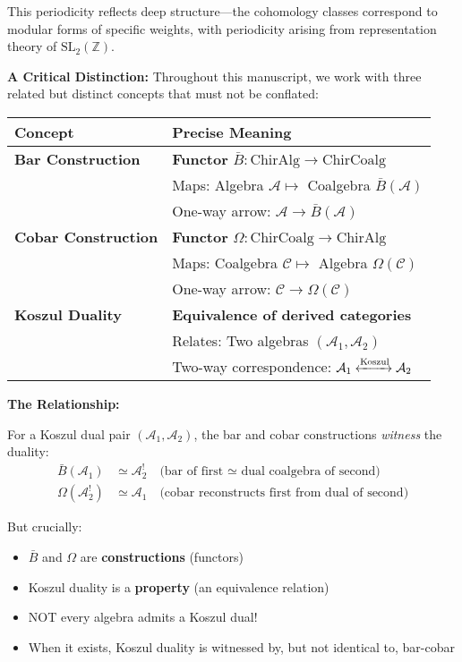 This periodicity reflects deep structure—the cohomology classes correspond to modular forms of specific weights, with periodicity arising from representation theory of $\text{SL}_2(\mathbb{Z})$.

\begin{remark}\label{rem:bar-cobar-koszul-distinction}
\textbf{A Critical Distinction:} Throughout this manuscript, we work with three related but distinct concepts that must not be conflated:

\begin{center}
\begin{tabular}{|l|p{10cm}|}
\hline
\textbf{Concept} & \textbf{Precise Meaning} \\
\hline
\textbf{Bar Construction} & \textbf{Functor} $\bar{B}: \text{ChirAlg} \to \text{ChirCoalg}$ \\
 & Maps: Algebra $\mathcal{A} \mapsto$ Coalgebra $\bar{B}(\mathcal{A})$ \\
 & One-way arrow: $\mathcal{A} \to \bar{B}(\mathcal{A})$ \\
\hline
\textbf{Cobar Construction} & \textbf{Functor} $\Omega: \text{ChirCoalg} \to \text{ChirAlg}$ \\
 & Maps: Coalgebra $\mathcal{C} \mapsto$ Algebra $\Omega(\mathcal{C})$ \\
 & One-way arrow: $\mathcal{C} \to \Omega(\mathcal{C})$ \\
\hline
\textbf{Koszul Duality} & \textbf{Equivalence of derived categories} \\
 & Relates: Two algebras $(\mathcal{A}_1, \mathcal{A}_2)$ \\
 & Two-way correspondence: $\mathcal{A}_1 \xleftrightarrow{\text{Koszul}} \mathcal{A}_2$ \\
\hline
\end{tabular}
\end{center}

\textbf{The Relationship:}

For a Koszul dual pair $(\mathcal{A}_1, \mathcal{A}_2)$, the bar and cobar constructions \textit{witness} the duality:
\begin{align*}
\bar{B}(\mathcal{A}_1) &\simeq \mathcal{A}_2^! \quad \text{(bar of first ≃ dual coalgebra of second)} \\
\Omega(\mathcal{A}_2^!) &\simeq \mathcal{A}_1 \quad \text{(cobar reconstructs first from dual of second)}
\end{align*}

But crucially:
\begin{itemize}
\item $\bar{B}$ and $\Omega$ are \textbf{constructions} (functors)
\item Koszul duality is a \textbf{property} (an equivalence relation)
\item NOT every algebra admits a Koszul dual!
\item When it exists, Koszul duality is witnessed by, but not identical to, bar-cobar
\end{itemize}
\end{remark}

